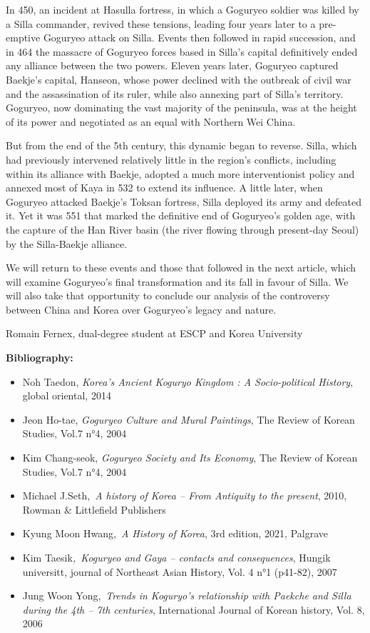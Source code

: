 \documentclass[11pt,a4paper]{article}
\begin{document}
In 450, an incident at Hasulla fortress, in which a Goguryeo soldier was killed by a Silla commander, revived these tensions, leading four years later to a pre-emptive Goguryeo attack on Silla. Events then followed in rapid succession, and in 464 the massacre of Goguryeo forces based in Silla's capital definitively ended any alliance between the two powers. Eleven years later, Goguryeo captured Baekje's capital, Hanseon, whose power declined with the outbreak of civil war and the assassination of its ruler, while also annexing part of Silla's territory. Goguryeo, now dominating the vast majority of the peninsula, was at the height of its power and negotiated as an equal with Northern Wei China.

But from the end of the 5th century, this dynamic began to reverse. Silla, which had previously intervened relatively little in the region's conflicts, including within its alliance with Baekje, adopted a much more interventionist policy and annexed most of Kaya in 532 to extend its influence. A little later, when Goguryeo attacked Baekje's Toksan fortress, Silla deployed its army and defeated it. Yet it was 551 that marked the definitive end of Goguryeo's golden age, with the capture of the Han River basin (the river flowing through present-day Seoul) by the Silla-Baekje alliance.

We will return to these events and those that followed in the next article, which will examine Goguryeo's final transformation and its fall in favour of Silla. We will also take that opportunity to conclude our analysis of the controversy between China and Korea over Goguryeo's legacy and nature.

Romain Fernex, dual-degree student at ESCP and Korea University

\textbf{Bibliography:}

\begin{itemize}
\item
  Noh Taedon, \emph{Korea's Ancient Koguryo Kingdom : A Socio-political History}, global oriental, 2014
\item
  Jeon Ho-tae, \emph{Goguryeo Culture and Mural Paintings}, The Review of Korean Studies, Vol.7 n°4, 2004
\item
  Kim Chang-seok, \emph{Goguryeo Society and Its Economy}, The Review of Korean Studies, Vol.7 n°4, 2004
\item
  Michael J.Seth,~\emph{A history of Korea -- From Antiquity to the present}, 2010, Rowman \& Littlefield Publishers
\item
  Kyung Moon Hwang,~\emph{A History of Korea}, 3rd edition, 2021, Palgrave
\item
  Kim Taesik\emph{,~Koguryeo and Gaya -- contacts and consequences}, Hungik universitt, journal of Northeast Asian History, Vol. 4 n°1 (p41-82), 2007
\item
  Jung Woon Yong,~\emph{Trends in Koguryo's relationship with Paekche and Silla during the 4th -- 7th centuries}, International Journal of Korean history, Vol. 8, 2006
\end{itemize}
\end{document}
